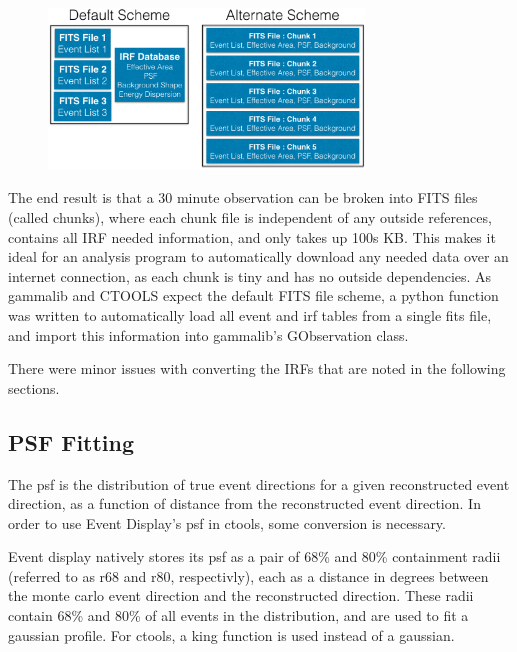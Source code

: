 \begin{figure}[ht]
  \begin{center}
    \includegraphics[width=0.75\textwidth]{images/FITS_diagrams_alternate_scheme.eps}
    \caption[FITS File Event Storage Schemes]{}\label{fig:fits_scheme}
  \end{center}
\end{figure}

The end result is that a 30 minute observation can be broken into  FITS files (called chunks), where each chunk file is independent of any outside references, contains all IRF needed information, and only takes up \nicetilde100s KB.
This makes it ideal for an analysis program to automatically download any needed data over an internet connection, as each chunk is tiny and has no outside dependencies.
As gammalib and CTOOLS expect the default FITS file scheme, a python function was written to automatically load all event and irf tables from a single fits file, and import this information into gammalib's GObservation class.

There were minor issues with converting the IRFs that are noted in the following sections.

\subsection{PSF Fitting}

The psf is the distribution of true event directions for a given reconstructed event direction, as a function of distance from the reconstructed event direction.
In order to use Event Display's psf in ctools, some conversion is necessary.

Event display natively stores its psf as a pair of 68\% and 80\% containment radii (referred to as r68 and r80, respectivly), each as a distance in degrees between the monte carlo event direction and the reconstructed direction.
These radii contain 68\% and 80\% of all events in the distribution, and are used to fit a gaussian profile.
For ctools, a king function is used instead of a gaussian.

